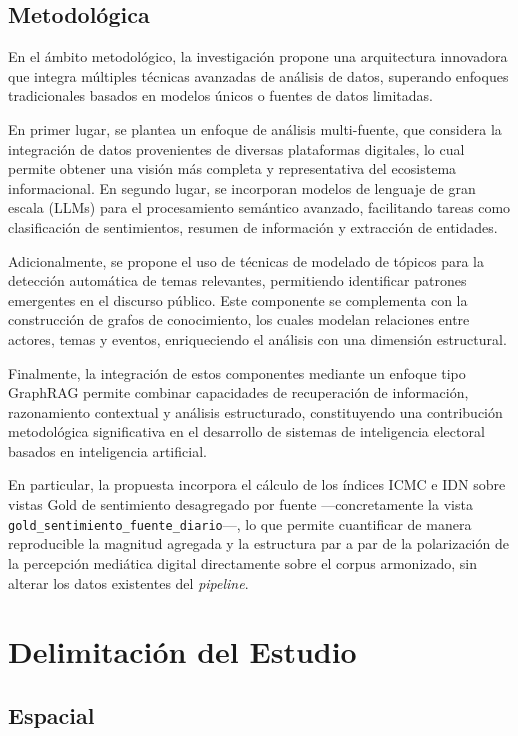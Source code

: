\subsection{Metodológica}

En el ámbito metodológico, la investigación propone una arquitectura innovadora que integra múltiples técnicas avanzadas de análisis de datos, superando enfoques tradicionales basados en modelos únicos o fuentes de datos limitadas.

En primer lugar, se plantea un enfoque de análisis multi-fuente, que considera la integración de datos provenientes de diversas plataformas digitales, lo cual permite obtener una visión más completa y representativa del ecosistema informacional. En segundo lugar, se incorporan modelos de lenguaje de gran escala (LLMs) para el procesamiento semántico avanzado, facilitando tareas como clasificación de sentimientos, resumen de información y extracción de entidades.

Adicionalmente, se propone el uso de técnicas de modelado de tópicos para la detección automática de temas relevantes, permitiendo identificar patrones emergentes en el discurso público. Este componente se complementa con la construcción de grafos de conocimiento, los cuales modelan relaciones entre actores, temas y eventos, enriqueciendo el análisis con una dimensión estructural.

Finalmente, la integración de estos componentes mediante un enfoque tipo GraphRAG permite combinar capacidades de recuperación de información, razonamiento contextual y análisis estructurado, constituyendo una contribución metodológica significativa en el desarrollo de sistemas de inteligencia electoral basados en inteligencia artificial.

En particular, la propuesta incorpora el cálculo de los índices ICMC e IDN sobre vistas Gold de sentimiento desagregado por fuente —concretamente la vista \texttt{gold\_sentimiento\_fuente\_diario}—, lo que permite cuantificar de manera reproducible la magnitud agregada y la estructura par a par de la polarización de la percepción mediática digital directamente sobre el corpus armonizado, sin alterar los datos existentes del \textit{pipeline}.

\section{Delimitación del Estudio}

\subsection{Espacial}

